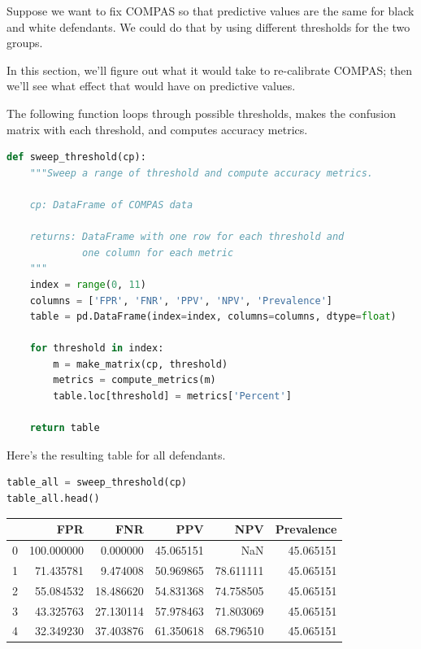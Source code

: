 Suppose we want to fix COMPAS so that predictive values are the same for
black and white defendants. We could do that by using different
thresholds for the two groups.

In this section, we'll figure out what it would take to re-calibrate
COMPAS; then we'll see what effect that would have on predictive values.

The following function loops through possible thresholds, makes the
confusion matrix with each threshold, and computes accuracy metrics.

\begin{lstlisting}[language=Python]
def sweep_threshold(cp):
    """Sweep a range of threshold and compute accuracy metrics.
    
    cp: DataFrame of COMPAS data
    
    returns: DataFrame with one row for each threshold and
             one column for each metric
    """
    index = range(0, 11)
    columns = ['FPR', 'FNR', 'PPV', 'NPV', 'Prevalence']
    table = pd.DataFrame(index=index, columns=columns, dtype=float) 

    for threshold in index:
        m = make_matrix(cp, threshold)
        metrics = compute_metrics(m)
        table.loc[threshold] = metrics['Percent']
        
    return table
\end{lstlisting}

Here's the resulting table for all defendants.

\begin{lstlisting}[language=Python]
table_all = sweep_threshold(cp)
table_all.head()
\end{lstlisting}

\begin{tabular}{lrrrrr}
\toprule
{} &         FPR &        FNR &        PPV &        NPV &  Prevalence \\
\midrule
0 &  100.000000 &   0.000000 &  45.065151 &        NaN &   45.065151 \\
1 &   71.435781 &   9.474008 &  50.969865 &  78.611111 &   45.065151 \\
2 &   55.084532 &  18.486620 &  54.831368 &  74.758505 &   45.065151 \\
3 &   43.325763 &  27.130114 &  57.978463 &  71.803069 &   45.065151 \\
4 &   32.349230 &  37.403876 &  61.350618 &  68.796510 &   45.065151 \\
\bottomrule
\end{tabular}

